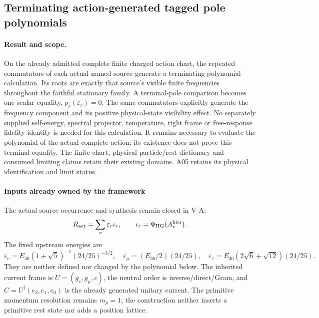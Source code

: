 \documentclass[12pt,a4paper]{article}
\begin{document}






\subsection{Terminating action-generated tagged pole polynomials}
\label{p4:sec:v2169-action-pole-polynomial}
\paragraph{Result and scope.}
On the already admitted complete finite charged action chart, the repeated
commutators of each actual named source generate a terminating polynomial
calculation. Its roots are exactly that source's visible finite frequencies
throughout the faithful stationary family. A terminal-pole comparison becomes
one scalar equality, $p_r(\varepsilon_r)=0$. The same commutators explicitly
generate the frequency component and its positive physical-state visibility
effect. No separately supplied self-energy, spectral projector, temperature,
right frame or free-response fidelity identity is needed for this calculation.
It remains necessary to evaluate the polynomial of the actual complete action;
its existence does not prove this terminal equality. The finite chart, physical
particle/rest dictionary and consumed limiting claims retain their existing
domains. A05 retains its physical identification and limit status.



\paragraph{Inputs already owned by the framework}
The actual source occurrence and synthesis remain closed in V-A:
\[
 R_{\rm act}=\sum_r\varepsilon_r\iota_r,\qquad
 \iota_r=\Phi_{\rm HG}(A_r^{\rm hier}).
\]
The fixed upstream energies are
\[
 \varepsilon_e=E_{40}(1+\sqrt5)^{-1}(24/25)^{-3/2},\quad
 \varepsilon_\mu=(E_{36}/2)(24/25),\quad
 \varepsilon_\tau=E_{36}(2\sqrt6+\sqrt{12})(24/25).
\]
They are neither defined nor changed by the polynomial below. The inherited
current frame is $U=(g_e,g_\mu,c)$, the neutral order is inverse/direct/Gram,
and $C=U^\dagger(e_2,e_1,e_0)$ is the already generated unitary current.
The primitive momentum resolution remains $m_p=1$; the construction neither
inserts a primitive rest state nor adds a position lattice.
\end{document}
